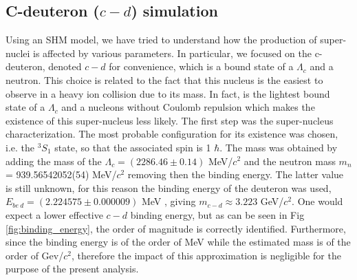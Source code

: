 \documentclass[12pt,a4paper]{book}
\begin{document}
	
	\FloatBarrier
	\subsection{C-deuteron ($c-d$) simulation}
	
	Using an SHM model, we have tried to understand how the production of super-nuclei is affected by various parameters. In particular, we focused on the c-deuteron, denoted $c-d$ for convenience, which is a bound state of a $\Lambda_c$ and a neutron. This choice is related to the fact that this nucleus is the easiest to observe in a heavy ion collision due to its mass. In fact, is the lightest bound state of a $\Lambda_c$ and a nucleons without Coulomb repulsion which makes the existence of this super-nucleus less likely. The first step was the super-nucleus characterization. The most probable configuration for its existence was chosen, i.e. the $^{3}S_1$ state, so that the associated spin is 1 $\hbar$. The mass was obtained by adding the mass of the $\Lambda_c = (2286.46 \pm 0.14)$ MeV/$c^2$ and the neutron mass $m_n$ = 939.56542052(54) MeV/$c^2$ \cite{ParticleDataGroup:2024cfk} removing then the binding energy. The latter value is still unknown, for this reason the binding energy of the deuteron was used, $E_{be\ d} = (2.224575 \pm 0.000009)$ MeV \cite{VANDERLEUN1982261}, giving $m_{c-d} \approx 3.223$ GeV/$c^2$. One would expect a lower effective $c-d$ binding energy, but as can be seen in Fig \ref{fig:binding_energy}, the order of magnitude is correctly identified. Furthermore, since the binding energy is of the order of MeV while the estimated mass is of the order of Gev/$c^2$, therefore the impact of this approximation is negligible for the purpose of the present analysis.
	
\end{document}
